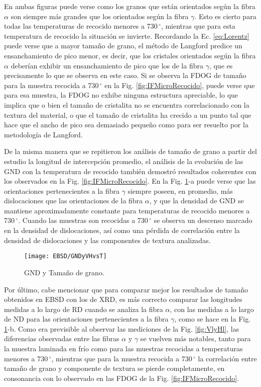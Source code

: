 En ambas figuras puede verse como los granos que están orientados según la fibra $\alpha$ son siempre más grandes que los orientados según la fibra $\gamma$.
Esto es cierto para todas las temperaturas de recocido menores a 730\,$^{\circ}$, mientras que para esta temperatura de recocido la situación se invierte.
Recordando la Ec. \ref{eq:Lorentz} puede verse que a mayor tamaño de grano, el método de Langford predice un ensanchamiento de pico menor, es decir, que los cristales orientados según la fibra $\alpha$ deberían exhibir un ensanchamiento de pico que los de la fibra $\gamma$, que es precisamente lo que se observa en este caso.
Si se observa la FDOG de tamaño para la muestra recocida a 730\,$^{\circ}$ en la Fig. \ref{fig:IFMicroRecocido}, puede verse que para esa muestra, la FDOG no exhibe ninguna estructura apreciable, lo que implica que o bien el tamaño de cristalita no se encuentra correlacionado con la textura del material, o que el tamaño de cristalita ha crecido a un punto tal que hace que el ancho de pico sea demasiado pequeño como para ser resuelto por la metodología de Langford.

De la misma manera que se repitieron los análisis de tamaño de grano a partir del estudio la longitud de intercepción promedio, el análisis de la evolución de las GND con la temperatura de recocido también demostró resultados coherentes con los observados en la Fig. \ref{fig:IFMicroRecocido}.
En la Fig. \ref{fig:GNDyVH}-a puede verse que las orientaciones pertenecientes a la fibra $\gamma$ siempre poseen, en promedio, más dislocaciones que las orientaciones de la fibra $\alpha$, y que la densidad de GND se mantiene aproximadamente constante para temperaturas de recocido menores a 730\,$^{\circ}$.
Cuando las muestras son recocidas a 730\,$^{\circ}$ se observa un descenso marcado en la densidad de dislocaciones, así como una pérdida de correlación entre la densidad de dislocaciones y las componentes de textura analizadas.

\begin{figure}[!htb]
  \centering
  \texttt{[image: EBSD/GNDyVHvsT]}
  \caption{GND y Tamaño de grano.}
  \label{fig:GNDyVH}
\end{figure}

Por último, cabe mencionar que para comparar mejor los resultados de tamaño obtenidos en EBSD con los de XRD, es más correcto comparar las longitudes medidas a lo largo de RD cuando se analiza la fibra $\alpha$, con las medidas a lo largo de ND para las orientaciones pertenecientes a la fibra $\gamma$, como se hace en la Fig. \ref{fig:GNDyVH}-b.
Como era previsible al observar las mediciones de la Fig. \ref{fig:VlyHl}, las diferencias observadas entre las fibras $\alpha$ y $\gamma$ se vuelven más notables, tanto para la muestra laminada en frío como para las muestras recocidas a temperaturas menores a 730\,$^{\circ}$, mientras que para la muestra recocida a 730\,$^{\circ}$ la correlación entre tamaño de grano y componente de textura se pierde completamente, en consonancia con lo observado en las FDOG de la Fig. \ref{fig:IFMicroRecocido}.




